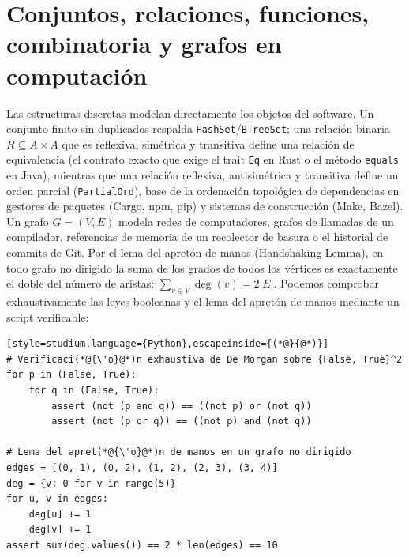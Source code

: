 \documentclass{book}
\begin{document}
\section{Conjuntos, relaciones, funciones, combinatoria y grafos en computación}

Las estructuras discretas modelan directamente los objetos del software. Un conjunto finito sin duplicados respalda \texttt{HashSet}/\texttt{BTreeSet}; una relación binaria \(R \subseteq A \times A\) que es reflexiva, simétrica y transitiva define una relación de equivalencia (el contrato exacto que exige el trait \texttt{Eq} en Rust o el método \texttt{equals} en Java), mientras que una relación reflexiva, antisimétrica y transitiva define un orden parcial (\texttt{PartialOrd}), base de la ordenación topológica de dependencias en gestores de paquetes (Cargo, npm, pip) y sistemas de construcción (Make, Bazel).
Un grafo \(G = (V, E)\) modela redes de computadores, grafos de llamadas de un compilador, referencias de memoria de un recolector de basura o el historial de commits de Git. Por el lema del apretón de manos (Handshaking Lemma), en todo grafo no dirigido la suma de los grados de todos los vértices es exactamente el doble del número de aristas: \(\sum_{v \in V} \deg(v) = 2|E|\). Podemos comprobar exhaustivamente las leyes booleanas y el lema del apretón de manos mediante un script verificable:
\begin{lstlisting}[style=studium,language={Python},escapeinside={(*@}{@*)}]
# Verificaci(*@{\'o}@*)n exhaustiva de De Morgan sobre {False, True}^2
for p in (False, True):
    for q in (False, True):
        assert (not (p and q)) == ((not p) or (not q))
        assert (not (p or q)) == ((not p) and (not q))

# Lema del apret(*@{\'o}@*)n de manos en un grafo no dirigido
edges = [(0, 1), (0, 2), (1, 2), (2, 3), (3, 4)]
deg = {v: 0 for v in range(5)}
for u, v in edges:
    deg[u] += 1
    deg[v] += 1
assert sum(deg.values()) == 2 * len(edges) == 10
\end{lstlisting}
\end{document}
